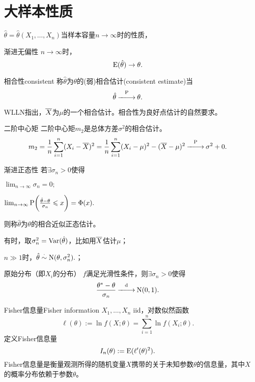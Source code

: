 \section{大样本性质}

$\hat\theta=\hat\theta(X_1,\ldots,X_n)$当样本容量$n\to\infty$时的性质，

\begin{definition}{渐进无偏性}{}
	$n\to\infty$时，
	\begin{equation}
		\E(\hat\theta)\to\theta.
	\end{equation}
\end{definition}
\begin{definition}{相合性}{consistent}
	称$\hat\theta$为$\theta$的(弱)相合估计(consistent estimate)当
	\begin{equation}
		\hat\theta\pto\theta.
	\end{equation}
\end{definition}
WLLN指出，$\avg X$为$\mu$的一个相合估计。相合性为良好点估计的自然要求。
\begin{example}{二阶中心矩}{}
	二阶中心矩$m_2$是总体方差$\sigma^2$的相合估计。
	\[
		m_2=\frac1n\sum_{i=1}^n(X_i-\avg X)^2=\frac1n\sum_{i=1}^n(X_i-\mu)^2-(\avg X-\mu)^2\pto\sigma^2+0.
	\]
\end{example}
\begin{definition}{渐进正态性}{}
	若$\exists\sigma_n>0$使得
	\begin{compactenum}
		\item $\lim_{n\to\infty}\sigma_n=0;$
		\item $\lim_{n\to\infty}\P\biggl(\frac{\hat\theta-\theta}{\sigma_n}\leqslant x\biggr)=\Phi(x).$
	\end{compactenum}
	则称$\hat\theta$为$\theta$的相合近似正态估计。
\end{definition}
\begin{compactenum}
	\item 有时，取$\sigma_n^2=\Var(\hat\theta)$，比如用$\avg X$估计$\mu$；
	\item $n\gg 1$时，$\hat\theta\dotsim\Norm(\theta,\sigma_n^2).$；
	\item 原始分布（即$X_i$的分布） $f$满足光滑性条件，则$\exists\sigma_n>0$使得
	\begin{equation}
		\label{MLE-dto-N01}
		\frac{\theta^\ast-\theta}{\sigma_n}\dto\Norm(0,1).
	\end{equation}
\end{compactenum}
\begin{definition}{Fisher信息量}{Fisher information}
	$X_1,\ldots,X_n$ iid，对数似然函数
	\[
		\ell(\theta):=\ln f(X;\theta)=\sum_{i=1}^n\ln f(X_i;\theta).
	\]
	定义Fisher信息量
	\begin{equation}
		I_n(\theta):=\E(\ell'(\theta)^2).
	\end{equation}
	Fisher信息量是衡量观测所得的随机变量$X$携带的关于未知参数$\theta$的信息量，其中$X$的概率分布依赖于参数$\theta$。
\end{definition}

